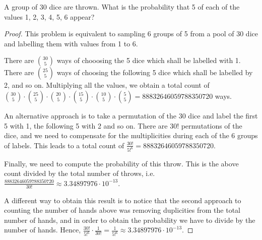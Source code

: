 \begin{exercise}{34}
    A group of 30 dice are thrown. What is the probability that 5 of each of the values 1, 2, 3, 4, 5, 6 appear?
\end{exercise}


\begin{proof}
    This problem is equivalent to sampling 6 groups of 5 from a pool of 30 dice and labelling them with values from 1 to 6.

    There are $30 \choose 5$ ways of chooosing the 5 dice which shall be labelled with 1. There are $25 \choose 5$ ways of choosing the following 5 dice which shall be labelled by 2, and so on. Multiplying all the values, we obtain a total count of ${30 \choose 5} \cdot {25 \choose 5} \cdot {20 \choose 5} \cdot {15 \choose 5} \cdot {10 \choose 5} \cdot {5 \choose 5} = 88832646059788350720$ ways.

    \vspace{2em}

    An alternative approach is to take a permutation of the 30 dice and label the first 5 with 1, the following 5 with 2 and so on. There are 30! permutations of the dice, and we need to compensate for the multiplicities during each of the 6 groups of labels. This leads to a total count of $\frac{30!}{5!^6} = 88832646059788350720$.

    \vspace{2em}

    Finally, we need to compute the probability of this throw. This is the above count divided by the total number of throws, i.e. $\frac{88832646059788350720}{30!} \approx 3.34897976 \cdot 10^{-13}$.

    A different way to obtain this result is to notice that the second approach to counting the number of hands above was removing duplicities from the total number of hands, and in order to obtain the probability we have to divide by the number of hands. Hence, $\frac{30!}{5!^6} \cdot \frac{1}{30!} = \frac{1}{5!^6} \approx 3.34897976 \cdot 10^{-13}$.
\end{proof}


